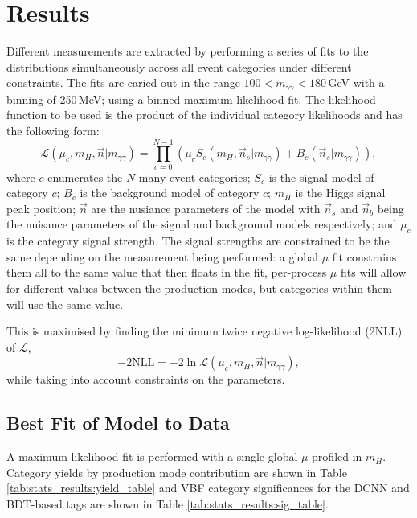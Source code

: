 \section{Results}
Different measurements are extracted by performing a series of fits to the \mgg distributions simultaneously across all event categories under different constraints. 
The fits are caried out in the range $100 < m_{\gamma\gamma} < 180$\,GeV with a binning of 250\,MeV; using a binned maximum-likelihood fit.
The likelihood function to be used is the product of the individual category likelihoods and has the following form:
\begin{equation}
    \mathcal{L}(\mu_{c},m_H,\vec{n}|m_{\gamma\gamma}) = \prod_{c=0}^{N-1} \left( \mu_{c} S_{c}( m_{H}, \vec{n}_{s} | m_{\gamma\gamma}) + B_{c}( \vec{n}_{s} | m_{\gamma\gamma}) \right),
\end{equation}
where $c$ enumerates the $N$-many event categories; $S_{c}$ is the signal model of category $c$; $B_{c}$ is the background model of category $c$; $m_H$ is the Higgs signal peak position; $\vec{n}$ are the nusiance parameters of the model with $\vec{n}_s$ and $\vec{n}_b$ being the nuisance parameters of the signal and background models respectively; and $\mu_{c}$ is the category signal strength. 
The signal strengths are constrained to be the same depending on the measurement being performed: a global $\mu$ fit constrains them all to the same value that then floats in the fit, per-process $\mu$ fits will allow for different values between the production modes, but categories within them will use the same value. 

This is maximised by finding the minimum twice negative log-likelihood (2NLL) of $\mathcal{L}$, 
\begin{equation}
    -2\mathrm{NLL} = -2\ln\mathcal{L}(\mu_{c},m_H,\vec{n}|m_{\gamma\gamma}),
\end{equation}
while taking into account constraints on the parameters. 

\subsection{Best Fit of Model to Data}
A maximum-likelihood fit is performed with a single global $\mu$ profiled in $m_H$. 
Category yields by production mode contribution are shown in Table \ref{tab:stats_results:yield_table} and 
VBF category significances for the DCNN and BDT-based tags are shown in Table \ref{tab:stats_results:sig_table}.

